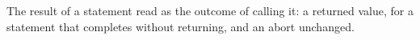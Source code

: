 The result of a statement read as the outcome of calling it: a returned value,  for a
statement that completes without returning, and an abort unchanged.
